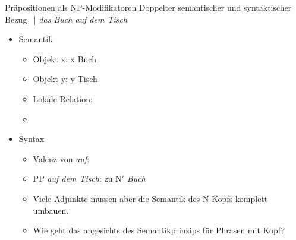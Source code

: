 \begin{frame}
  {Präpositionen als NP-Modifikatoren}
  \onslide<+->
  \onslide<+->
  Doppelter semantischer und syntaktischer Bezug \onslide<+->\ | \alert{\textit{das Buch auf dem Tisch}}\\
  \Halbzeile
  \begin{itemize}[<+->]
    \item Semantik
      \Viertelzeile
      \begin{itemize}[<+->]
        \item Objekt x: x  Buch
        \item Objekt y: y  Tisch
        \item Lokale Relation: 
        \item %
      \end{itemize}
      \Halbzeile
    \item Syntax
      \begin{itemize}[<+->]
        \item Valenz von \textit{auf}: %
        \item PP \textit{auf dem Tisch}:  zu N$'$ \textit{Buch}
        \item Viele Adjunkte müssen aber die Semantik des N-Kopfs komplett umbauen.
        \item Wie geht das angesichts des Semantikprinzips für Phrasen mit Kopf?
      \end{itemize}
  \end{itemize}
\end{frame}

